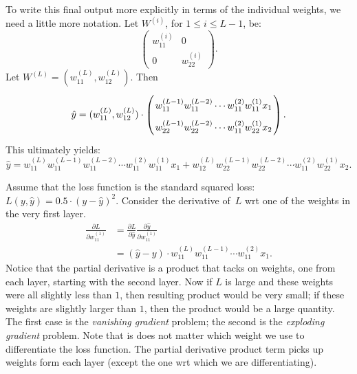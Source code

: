 To write this final output more explicitly in terms of the individual weights, 
we need a little more notation. Let $W^{(i)}$, for $1 \leq i \leq L - 1$, be:
\[
    \left ( 
        \begin{array}{cc}
            w_{11}^{(i)} & 0            \\
            0            & w_{22}^{(i)}
        \end{array}
    \right ).
\]
Let $W^{(L)} = (w_{11}^{(L)}, w_{12}^{(L)})$. Then 
\[\arraycolsep=1.2pt\def\arraystretch{1.9}
    \hat{y} = (w_{11}^{(L)}, w_{12}^{(L)}) \cdot 
             \left ( 
                \begin{array}{cc}
                    w_{11}^{(L - 1)} w_{11}^{(L - 2)} \cdots w_{11}^{(2)} w_{11}^{(1)} x_1 \\ 
                    w_{22}^{(L - 1)} w_{22}^{(L - 2)} \cdots w_{11}^{(2)} w_{22}^{(1)} x_2
                \end{array}
            \right ).
\]
This ultimately yields:
\[
    \hat{y} =  w_{11}^{(L)} w_{11}^{(L - 1)} w_{11}^{(L - 2)} \cdots w_{11}^{(2)} w_{11}^{(1)} x_1 
               + w_{12}^{(L)} w_{22}^{(L - 1)} w_{22}^{(L - 2)} \cdots w_{11}^{(2)} w_{22}^{(1)} x_2.
\]

Assume that the loss function is the standard squared loss: $L(y, \hat{y}) = 0.5 \cdot (y - \hat{y})^2$. 
Consider the derivative of~$L$ wrt one of the weights in the very first layer. 
\begin{align*}
    \frac{\partial L}{\partial w_{11}^{(1)}} & = 
        \frac{\partial L}{\partial \hat{y}}
        \frac{\partial \hat{y}}{\partial w_{11}^{(1)}} \\
        & = (\hat{y} - y) \cdot w_{11}^{(L)} w_{11}^{(L - 1)} \cdots w_{11}^{(2)} x_1. 
\end{align*}
Notice that the partial derivative is a product that tacks on weights, one from each 
layer, starting with the second layer. Now if $L$ is large and these weights were 
all slightly less than $1$, then resulting product would be very small; if these weights 
are slightly larger than $1$, then the product would be a large quantity. The first 
case is the \emph{vanishing gradient} problem; the second is the 
\emph{exploding gradient} problem. Note that is does not matter which 
weight we use to differentiate the loss function. The partial derivative product 
term picks up weights form each layer (except the one wrt which we are differentiating). 
 
